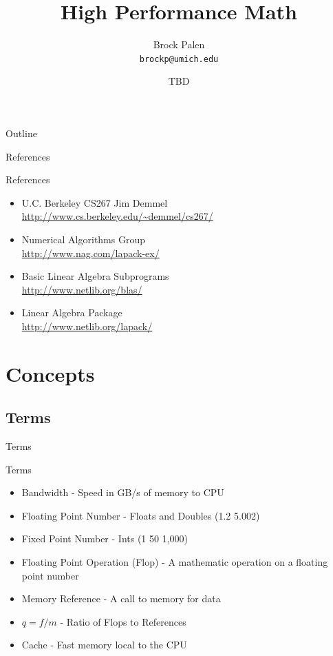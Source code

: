 \documentclass[handout]{beamer}
\title[CAC High Performance Math] {High Performance Math}
\author{Brock Palen\\ \texttt{brockp@umich.edu}}
\date{TBD}
\begin{document}
  \begin{frame}
    \titlepage
  \end{frame}

  \begin{frame}{Outline}
    \tableofcontents
  \end{frame}
 
\begin{frame}{References}
 \begin{block}{References}
  \begin{itemize}
   \item U.C. Berkeley CS267 Jim Demmel \\
     \url{http://www.cs.berkeley.edu/~demmel/cs267/}
   \item Numerical Algorithms Group     \\
     \url{http://www.nag.com/lapack-ex/}
   \item Basic Linear Algebra Subprograms \\
     \url{http://www.netlib.org/blas/}
   \item Linear Algebra Package         \\
     \url{http://www.netlib.org/lapack/}
  \end{itemize}
 \end{block}
\end{frame} 



\section{Concepts}
\subsection{Terms}
\begin{frame}{Terms}
 \begin{block}{Terms}
  \begin{itemize}
   \item<1-> Bandwidth - Speed in GB/s of memory to CPU
   \item<2-> Floating Point Number - Floats and Doubles (1.2 5.002)
   \item<2-> Fixed Point Number - Ints (1 50 1,000)
   \item<3-> Floating Point Operation (Flop) - A mathematic operation on a floating point number
   \item<4-> Memory Reference - A call to memory for data
   \item<5->  $q=f/m$ - Ratio of Flops to References
   \item<6-> Cache - Fast memory local to the CPU
  \end{itemize}
 \end{block}
\end{frame}
\end{document}
